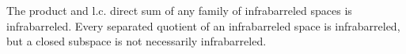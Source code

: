 The product and l.c. direct sum of any family of infrabarreled spaces is infrabarreled. Every separated quotient of an infrabarreled space is infrabarreled, but a closed subspace is not necessarily infrabarreled.
